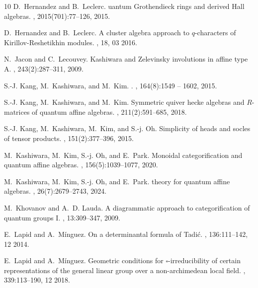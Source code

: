 \documentclass[11pt,reqno]{amsart}
\theoremstyle{definition} \newtheorem*{defn}{Definition}
\theoremstyle{definition}
\numberwithin{equation}{section}
\begin{document}
\begin{thebibliography}{10}
D.~Hernandez and B.~Leclerc.
uantum {G}rothendieck rings and derived {H}all algebras.
, 2015(701):77--126, 2015.

D.~Hernandez and B.~Leclerc.
\newblock A cluster algebra approach to {$q$}-characters of {K}irillov-{R}eshetikhin modules.
, 18, 03 2016.

N.~Jacon and C.~Lecouvey.
\newblock Kashiwara and {Z}elevinsky involutions in affine type {A}.
, 243(2):287--311, 2009.

S.-J. Kang, M.~Kashiwara, and M.~Kim.
.
, 164(8):1549 -- 1602, 2015.

S.-J. Kang, M.~Kashiwara, and M.~Kim.
\newblock Symmetric quiver hecke algebras and $R$-matrices of quantum affine algebras.
, 211(2):591--685, 2018.

S.-J. Kang, M.~Kashiwara, M.~Kim, and S.-j. Oh.
\newblock Simplicity of heads and socles of tensor products.
, 151(2):377--396, 2015.

M.~Kashiwara, M.~Kim, S.-j. Oh, and E.~Park.
\newblock Monoidal categorification and quantum affine algebras.
, 156(5):1039–1077, 2020.

M.~Kashiwara, M.~Kim, S.-j. Oh, and E.~Park.
 theory for quantum affine algebras.
, 26(7):2679–2743, 2024.

M.~Khovanov and A.~D. Lauda.
\newblock A diagrammatic approach to categorification of quantum groups {I}.
, 13:309--347, 2009.

E.~Lapid and A.~Mínguez.
\newblock On a determinantal formula of {T}adi\'c.
, 136:111--142, 12 2014.

E.~Lapid and A.~Mínguez.
\newblock Geometric conditions for $\square$-irreducibility of certain representations of the general linear group over a non-archimedean local field.
, 339:113--190, 12 2018.


\end{thebibliography}
\end{document}
